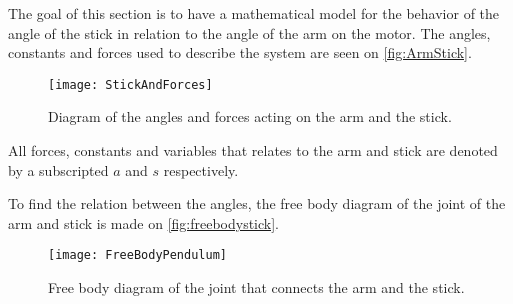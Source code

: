 \graphicspath{{figures/Preanalysis&Requirement/PendulumModeling/}}
The goal of this section is to have a mathematical model for the behavior of the angle of the stick in relation to the angle of the arm on the motor. The angles, constants and forces used to describe the system are seen on \autoref{fig:ArmStick}.
\begin{figure}[htbp]
\centering
\texttt{[image: StickAndForces]}
\caption{Diagram of the angles and forces acting on the arm and the stick.}
\label{fig:ArmStick}
\end{figure}
All forces, constants and variables that relates to the arm and stick are denoted by a subscripted $a$ and $s$ respectively. 

To find the relation between the angles, the free body diagram of the joint of the arm and stick is made on \autoref{fig:freebodystick}.
\begin{figure}[htbp]
\centering
\texttt{[image: FreeBodyPendulum]}
\caption{Free body diagram of the joint that connects the arm and the stick.}
\label{fig:freebodystick}
\end{figure}

